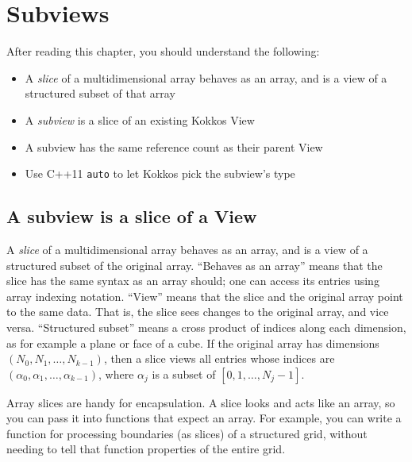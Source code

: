 \chapter{Subviews}\label{C:Subviews}

After reading this chapter, you should understand the following:
\begin{itemize}
\item A \emph{slice} of a multidimensional array behaves as an array,
  and is a view of a structured subset of that array
\item A \emph{subview} is a slice of an existing Kokkos View
\item A subview has the same reference count as their parent View
\item Use C++11 \texttt{auto} to let Kokkos pick the subview's type
\end{itemize}

\section{A subview is a slice of a View}\label{S:Subviews:Slice}

A \emph{slice} of a multidimensional array behaves as an array, and is
a view of a structured subset of the original array.  ``Behaves as an
array'' means that the slice has the same syntax as an array should;
one can access its entries using array indexing notation.  ``View''
means that the slice and the original array point to the same data.
That is, the slice sees changes to the original array, and vice versa.
``Structured subset'' means a cross product of indices along each
dimension, as for example a plane or face of a cube.  If the original
array has dimensions $(N_0, N_1, \dots, N_{k-1})$, then a slice views
all entries whose indices are $(\alpha_0, \alpha_1, \dots,
\alpha_{k-1})$, where $\alpha_j$ is a subset of $[0, 1, \dots,
N_j-1]$.

Array slices are handy for encapsulation.  A slice looks and acts like
an array, so you can pass it into functions that expect an array.  For
example, you can write a function for processing boundaries (as
slices) of a structured grid, without needing to tell that function
properties of the entire grid.

